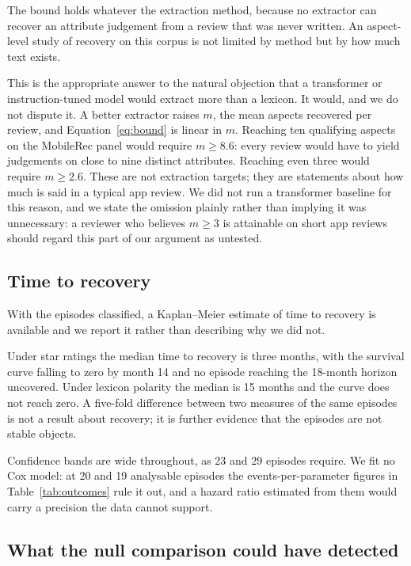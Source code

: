 \documentclass[11pt,a4paper]{article}
\makeatletter
\let\original@subsection\subsection
\renewcommand{\subsection}{\FloatBarrier\original@subsection}%
\makeatother
\begin{document}
The bound holds whatever the extraction method, because no extractor can
recover an attribute judgement from a review that was never written. An
aspect-level study of recovery on this corpus is not limited by method but by
how much text exists.

This is the appropriate answer to the natural objection that a transformer or
instruction-tuned model would extract more than a lexicon. It would, and we do
not dispute it. A better extractor raises $m$, the mean aspects recovered per
review, and Equation~\ref{eq:bound} is linear in $m$. Reaching ten qualifying
aspects on the MobileRec panel would require $m \geq 8.6$: every review would
have to yield judgements on close to nine distinct attributes. Reaching even
three would require $m \geq 2.6$. These are not extraction targets; they are
statements about how much is said in a typical app review. We did not run a
transformer baseline for this reason, and we state the omission plainly rather
than implying it was unnecessary: a reviewer who believes $m \geq 3$ is
attainable on short app reviews should regard this part of our argument as
untested.

\subsection{Time to recovery}
\label{sec:km}

With the episodes classified, a Kaplan--Meier estimate of time to recovery is
available and we report it rather than describing why we did not.

Under star ratings the median time to recovery is three months, with the
survival curve falling to zero by month 14 and no episode reaching the
18-month horizon uncovered. Under lexicon polarity the median is 15 months and
the curve does not reach zero. A five-fold difference between two measures of
the same episodes is not a result about recovery; it is further evidence that
the episodes are not stable objects.

Confidence bands are wide throughout, as 23 and 29 episodes require. We fit no
Cox model: at 20 and 19 analysable episodes the events-per-parameter figures in
Table~\ref{tab:outcomes} rule it out, and a hazard ratio estimated from them
would carry a precision the data cannot support.

\subsection{What the null comparison could have detected}
\label{sec:nullpower}
\end{document}
